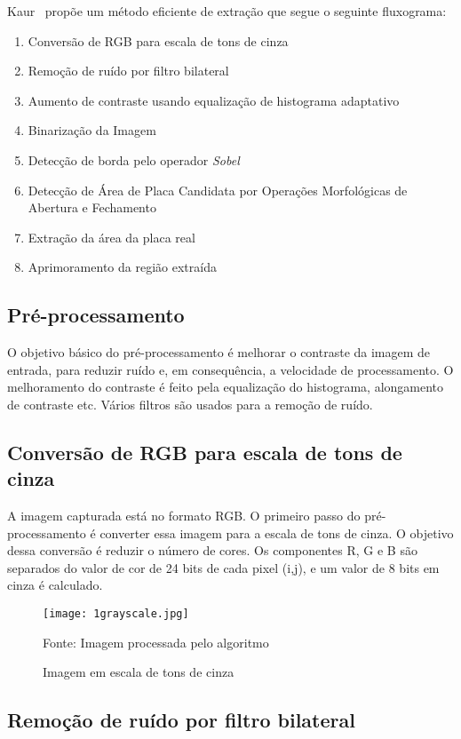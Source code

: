 Kaur~\cite{kaur2014efficient} propõe um método eficiente de
extração que segue o seguinte fluxograma:

\begin{enumerate}
	\item Conversão de RGB para escala de tons de cinza
	\item Remoção de ruído por filtro bilateral
	\item Aumento de contraste usando equalização de histograma adaptativo
	\item Binarização da Imagem
	\item Detecção de borda pelo operador \emph{Sobel}
	\item Detecção de Área de Placa Candidata por Operações Morfológicas de Abertura e Fechamento
	\item Extração da área da placa real
	\item Aprimoramento da região extraída
\end{enumerate}

\subsection{Pré-processamento}

O objetivo básico do pré-processamento é melhorar o contraste da imagem de
entrada, para reduzir ruído e, em consequência, a velocidade de
processamento. O melhoramento do contraste é feito pela equalização do
histograma, alongamento de contraste etc. Vários filtros são usados para a
remoção de ruído.

\subsection{Conversão de RGB para escala de tons de cinza}

A imagem capturada está no formato RGB\@. O primeiro passo do pré-processamento é
converter essa imagem para a escala de tons de cinza. O objetivo dessa conversão é reduzir
o número de cores. Os componentes R, G e B são separados do valor de cor de 24
bits de cada pixel (i,j), e um valor de 8 bits em cinza é calculado.

\begin{figure}[H]
	\centering
	\texttt{[image: 1grayscale.jpg]}
	\caption{Imagem em escala de tons de cinza}
Fonte: Imagem processada pelo algoritmo
	\label{fig:ext_gray_scale}
\end{figure}

\subsection{Remoção de ruído por filtro bilateral}

